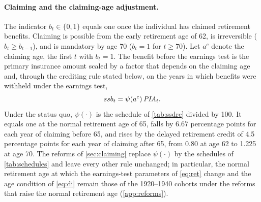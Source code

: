 \paragraph{Claiming and the claiming-age adjustment.}
The indicator $b_t\in\{0,1\}$ equals one once the individual has claimed retirement benefits. Claiming is possible from the early retirement age of 62, is irreversible ($b_t\geq b_{t-1}$), and is mandatory by age 70 ($b_t=1$ for $t\geq 70$). %
Let $a^c$ denote the claiming age, the first $t$ with $b_t=1$. The benefit before the earnings test is the primary insurance amount scaled by a factor that depends on the claiming age and, through the crediting rule stated below, on the years in which benefits were withheld under the earnings test,
\begin{equation}\label{eq:adjust}
ssb_t=\psi(a^c)\,\mathit{PIA}_t .
\end{equation}
Under the status quo, $\psi(\cdot)$ is the schedule of \autoref{tab:ssdrc} divided by 100. It equals one at the normal retirement age of 65, falls by 6.67 percentage points for each year of claiming before 65, and rises by the delayed retirement credit of 4.5 percentage points for each year of claiming after 65, from 0.80 at age 62 to 1.225 at age 70. %
The reforms of \autoref{sec:claiming} replace $\psi(\cdot)$ by the schedules of \autoref{tab:schedules} and leave every other rule unchanged; in particular, the normal retirement age at which the earnings-test parameters of \eqref{eq:ret} change and the age condition of \eqref{eq:di} remain those of the 1920--1940 cohorts under the reforms that raise the normal retirement age (\autoref{app:reforms}). %

